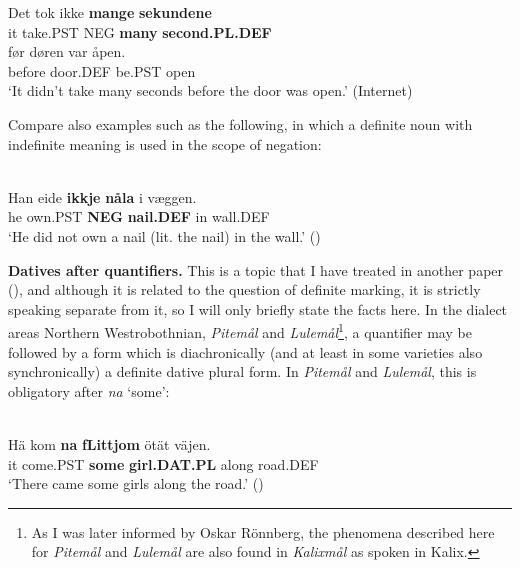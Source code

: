\z

\ea
\gll Det  tok  ikke  \textbf{mange} \textbf{sekundene}\\ %
it  take.PST  NEG  \textbf{many} \textbf{second.PL.DEF}\\
\gll før  døren  var  åpen.\\
before  door.DEF  be.PST  open\\
\glt  ‘It didn’t take many seconds before the door was open.’ (Internet)

\z

Compare also examples such as the following, in which a definite noun with indefinite meaning is used in the scope of negation:

\ea \label{} 
\\
\gll Han  eide  \textbf{ikkje} \textbf{nåla} i  væggen.\\
he  own.PST  \textbf{NEG} \textbf{nail.DEF} in  wall.DEF\\
\glt ‘He did not own a nail (lit. the nail) in the wall.’ (\citet[18]{Iversen1918})

\z

\textbf{Datives after quantifiers. }This is a topic that I have treated in another paper (\citet{Dahl2008}), and although it is related to the question of definite marking, it is strictly speaking separate from it, so I will only briefly state the facts here. In the dialect areas Northern Westrobothnian, \textit{Pitemål} and \textit{Lulemål}\footnote{ As I was later informed by Oskar Rönnberg, the phenomena described here for \textit{Pitemål} and \textit{Lulemål} are also found in \textit{Kalixmål}\textit{ }as spoken in Kalix.}, a quantifier may be followed by a form which is diachronically (and at least in some varieties also synchronically) a definite dative plural form. In \textit{Pitemål} and \textit{Lulemål}, this is obligatory after \textit{na} ‘some’:

\ea \label{} 
\\
\gll Hä  kom  \textbf{na} \textbf{  fLi{\textasciigrave}ttjom} ötät  väjen.\\
it  come.PST  \textbf{some} \textbf{girl.DAT.PL} along  road.DEF\\
\glt ‘There came some girls along the road.’ (\citet[19]{Brännström1993}) 

\z

